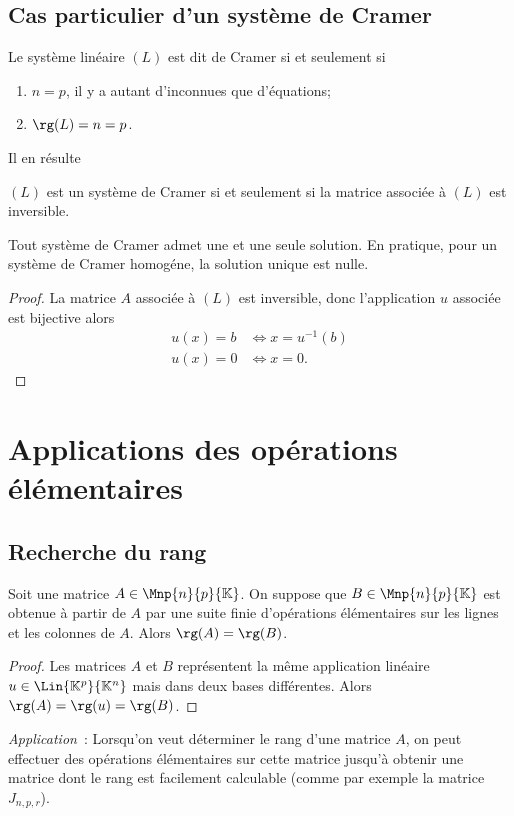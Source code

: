 \subsection{Cas particulier d'un  système de Cramer}
%
\begin{defdef}
  Le système linéaire $(L)$ est dit de Cramer si et seulement si
  \begin{enumerate}
  \item $n=p$, il y a autant d'inconnues que d'équations;
  \item $\rg(L)=n=p$.
  \end{enumerate}
\end{defdef}
Il en résulte
\begin{theo}
  $(L)$ est un système de Cramer si et seulement si la matrice associée à $(L)$ est inversible.
\end{theo}
%
\begin{theo}
  Tout système de Cramer admet une et une seule solution. En pratique, pour un système de Cramer homogéne, la solution unique est nulle.
\end{theo}
\begin{proof}
 La matrice $A$ associée à $(L)$ est inversible, donc l'application $u$ associée est bijective alors
 \begin{align}
   u(x)=b &\iff x=u^{-1}(b) \\
   u(x)=0 &\iff x=0.
 \end{align}
\end{proof}
%
\section{Applications des opérations élémentaires}
%

\subsection{Recherche du rang}
%
\begin{lemme}
  Soit une matrice $A \in \Mnp{n}{p}{\K}$. On suppose que $B\in \Mnp{n}{p}{\K}$ est obtenue à partir de $A$ par une suite finie d'opérations élémentaires sur les lignes et les colonnes de $A$. Alors $\rg(A)=\rg(B)$.
\end{lemme}
\begin{proof}
Les matrices $A$ et $B$ représentent la même application linéaire $u \in \Lin{\K^p}{\K^n}$ mais dans deux bases différentes. Alors $\rg(A)=\rg(u)=\rg(B)$.
\end{proof}
\emph{Application}~: Lorsqu'on veut déterminer le rang d'une matrice $A$, on peut effectuer des opérations élémentaires sur cette matrice jusqu'à obtenir une matrice dont le rang est facilement calculable (comme par exemple la matrice $J_{n,p,r}$).
%
